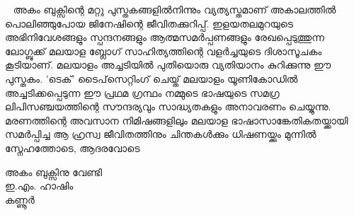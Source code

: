 ﻿~
\vfill
അകം ബുക്സിന്റെ മറ്റു പുസ്തകങ്ങളില്‍നിന്നും വ്യത്യസ്തമാണ് അകാലത്തില്‍ പൊലിഞ്ഞുപോയ ജിനേഷിന്റെ ജീവിതക്കുറിപ്പ്. ഇളയതലമുറയുടെ അഭിനിവേശങ്ങളും സ്പന്ദനങ്ങളും ആത്മസമര്‍പ്പണങ്ങളും രേഖപ്പെടുത്തുന്ന ലോഗ്ബുക്ക് മലയാള ബ്ലോഗ് സാഹിത്യത്തിന്റെ വളര്‍ച്ചയുടെ ദിശാസൂചകം കൂടിയാണ്. മലയാളം അച്ചടിയില്‍ പുതിയൊരു വ്യതിയാനം കുറിക്കുന്നു ഈ പുസ്തകം. 'ടെക്' ടൈപ്‌സെറ്റിംഗ് ചെയ്ത് മലയാളം യൂണികോഡില്‍ അച്ചടിക്കപ്പെടുന്ന ഈ പ്രഥമ ഗ്രന്ഥം നമ്മുടെ ഭാഷയുടെ സമഗ്ര ലിപിസഞ്ചയത്തിന്റെ സൗന്ദര്യവും സാദ്ധ്യതകളും അനാവരണം ചെയ്യുന്നു. മരണത്തിന്റെ അവസാന നിമിഷങ്ങളിലും മലയാള ഭാഷാസാങ്കേതികതയ്ക്കായി സമര്‍പ്പിച്ച ആ ഹ്രസ്വ ജീവിതത്തിനും ചിന്തകള്‍ക്കും ധിഷണയ്ക്കും മുന്നില്‍ സ്നേഹത്തോടെ, ആദരവോടെ

\begin{flushright}അകം ബുക്സിനു വേണ്ടി \\
ഇ.എം. ഹാഷിം \\
കണ്ണൂര്‍ \\ \end{flushright}
\vfill
\newpage

